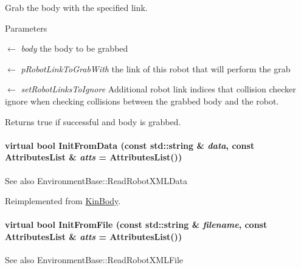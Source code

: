 Grab the body with the specified link. 


\begin{DoxyParams}{Parameters}
\item[\mbox{$\leftarrow$} {\em body}]the body to be grabbed \item[\mbox{$\leftarrow$} {\em pRobotLinkToGrabWith}]the link of this robot that will perform the grab \item[\mbox{$\leftarrow$} {\em setRobotLinksToIgnore}]Additional robot link indices that collision checker ignore when checking collisions between the grabbed body and the robot. \end{DoxyParams}
\begin{DoxyReturn}{Returns}
true if successful and body is grabbed. 
\end{DoxyReturn}
\hypertarget{classOpenRAVE_1_1RobotBase_a3f81f529c6959894555ad8841a134431}{
\paragraph[{InitFromData}]{\setlength{\rightskip}{0pt plus 5cm}virtual bool InitFromData (const std::string \& {\em data}, \/  const AttributesList \& {\em atts} = {\ttfamily AttributesList()})}\hfill}
\label{classOpenRAVE_1_1RobotBase_a3f81f529c6959894555ad8841a134431}
\begin{DoxySeeAlso}{See also}
EnvironmentBase::ReadRobotXMLData 
\end{DoxySeeAlso}


Reimplemented from \hyperlink{classOpenRAVE_1_1KinBody_a3f81f529c6959894555ad8841a134431}{KinBody}.

\hypertarget{classOpenRAVE_1_1RobotBase_ae67a1ee5e11749340bfbca5bd6749424}{
\paragraph[{InitFromFile}]{\setlength{\rightskip}{0pt plus 5cm}virtual bool InitFromFile (const std::string \& {\em filename}, \/  const AttributesList \& {\em atts} = {\ttfamily AttributesList()})}\hfill}
\label{classOpenRAVE_1_1RobotBase_ae67a1ee5e11749340bfbca5bd6749424}
\begin{DoxySeeAlso}{See also}
EnvironmentBase::ReadRobotXMLFile 
\end{DoxySeeAlso}



